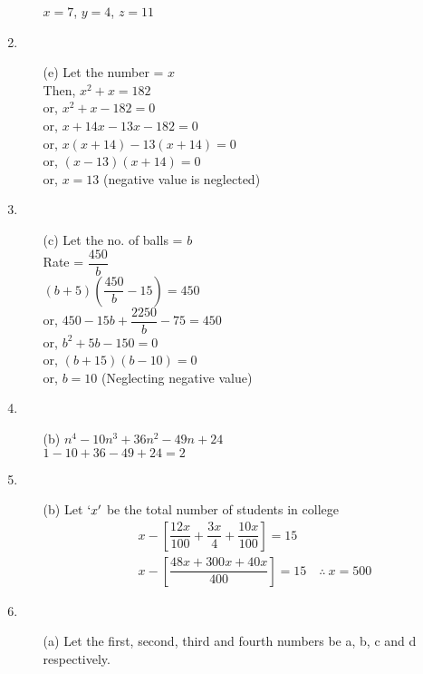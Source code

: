 \begin{multicols}{2}
\begin{enumerate}
\begin{itemize}
    $x = 7$, $y = 4$, $z = 11$
  \end{itemize}
\item
  \begin{itemize}
  \item[(e)] Let the number = $x$\\
    Then, $x^2 + x = 182$\\
    or, $x^2 + x - 182 = 0$\\
    or, $x + 14x - 13x - 182 = 0$\\
    or, $x(x + 14) - 13(x + 14) = 0$\\
    or, $(x - 13)(x + 14) = 0$\\
    or, $x = 13$ (negative value is neglected)
  \end{itemize}
\item
  \begin{itemize}
  \item[(c)] Let the no. of balls = $b$\\
    Rate = $\dfrac{450}{b}$\\
    $(b + 5) \left(\dfrac{450}{b} - 15\right) = 450$\\
    or, $450 - 15b + \dfrac{2250}{b} - 75 = 450$\\
    or, $b^2 + 5b - 150 = 0$\\
    or, $(b + 15)(b - 10) = 0$\\
    or, $b = 10$ (Neglecting negative value)
    \end{itemize}
\item
  \begin{itemize}
  \item[(b)] $n^4 - 10n^3 + 36n^2 - 49n + 24$\\
    $1 - 10 + 36 - 49 + 24 = 2$
  \end{itemize}
\item
  \begin{itemize}
  \item[(b)] Let $`x'$ be the total number of students in college
    \begin{align*}
      & x -\left[\dfrac{12x}{100} + \dfrac{3x}{4} + \dfrac{10x}{100} \right] = 15\\
      & x - \left[\dfrac{48x + 300x + 40x}{400}\right] = 15 \quad\therefore~ x = 500
      \end{align*}
  \end{itemize}
\item
  \begin{itemize}
  \item[(a)] Let the first, second, third and fourth numbers be a, b, c and d respectively.


\end{itemize}
\end{enumerate}
\end{multicols}
